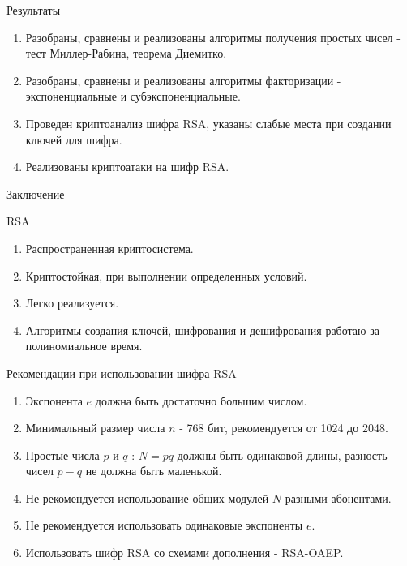
\begin{frame}{Результаты}
	\begin{center}
		\begin{enumerate}
			\item Разобраны, сравнены и реализованы алгоритмы получения простых чисел - тест Миллер-Рабина, теорема Диемитко. \vspace{0.5cm}
			\item Разобраны, сравнены и реализованы алгоритмы факторизации - экспоненциальные и субэкспоненциальные. \vspace{0.5cm}
			\item Проведен криптоанализ шифра RSA, указаны слабые места при создании ключей для шифра. \vspace{0.5cm}
			\item Реализованы криптоатаки на шифр RSA.
		\end{enumerate}
	\end{center}
\end{frame}

\begin{frame}{Заключение}

	\changefontsizes{8pt}

	\begin{center}		

		\begin{block}{RSA}
			\begin{enumerate}
				\item Распространенная криптосистема.
				\item Криптостойкая, при выполнении определенных условий.
				\item Легко реализуется.
				\item Алгоритмы создания ключей, шифрования и дешифрования работаю за полиномиальное время.
			\end{enumerate}	
		\end{block}

		\begin{block}{Рекомендации при использовании шифра RSA}
			\begin{enumerate}
				\item Экспонента $e$ должна быть достаточно большим числом.
				\item Минимальный размер числа $n$ - 768 бит, рекомендуется от 1024 до 2048.
				\item Простые числа $p$ и $q$ : $N=pq$ должны быть одинаковой длины, разность чисел $p - q$ не должна быть маленькой.
				\item Не рекомендуется использование общих модулей $N$ разными абонентами.
				\item Не рекомендуется использовать одинаковые экспоненты $e$.
				\item Использовать шифр RSA со схемами дополнения - RSA-OAEP.
			\end{enumerate}	
		\end{block}
	\end{center}

	\changefontsizes{13pt}

\end{frame}
